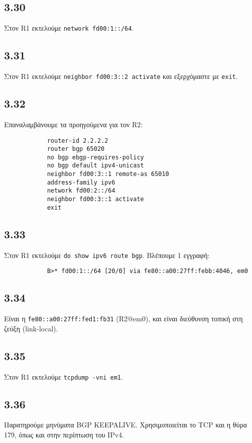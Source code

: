 \documentclass[a4paper, 12pt]{article}
\begin{document}
	\subsection*{3.30}
		Στον R1 εκτελούμε \verb|network fd00:1::/64|.

	\subsection*{3.31}
		Στον R1 εκτελούμε \verb|neighbor fd00:3::2 activate| και εξερχόμαστε με \verb|exit|.

	\subsection*{3.32}
		Επαναλαμβάνουμε τα προηγούμενα για τον R2:

		\begin{verbatim}
			router-id 2.2.2.2
			router bgp 65020
			no bgp ebgp-requires-policy
			no bgp default ipv4-unicast
			neighbor fd00:3::1 remote-as 65010
			address-family ipv6
			network fd00:2::/64
			neighbor fd00:3::1 activate
			exit
		\end{verbatim}		

	\subsection*{3.33}
		Στον R1 εκτελούμε \verb|do show ipv6 route bgp|. Βλέπουμε 1 εγγραφή:
		
		\begin{verbatim}
			B>* fd00:1::/64 [20/0] via fe80::a00:27ff:febb:4046, em0
		\end{verbatim}

	\subsection*{3.34}
		Είναι η \verb|fe80::a00:27ff:fed1:fb31| (R2@em0), και είναι διεύθυνση τοπική στη ζεύξη (link-local).

	\subsection*{3.35}
		Στον R1 εκτελούμε \verb|tcpdump -vni em1|.

	\subsection*{3.36}
		Παρατηρούμε μηνύματα BGP KEEPALIVE. Χρησιμοποιείται το TCP και η θύρα 179, όπως και στην περίπτωση του IPv4.
\end{document}
